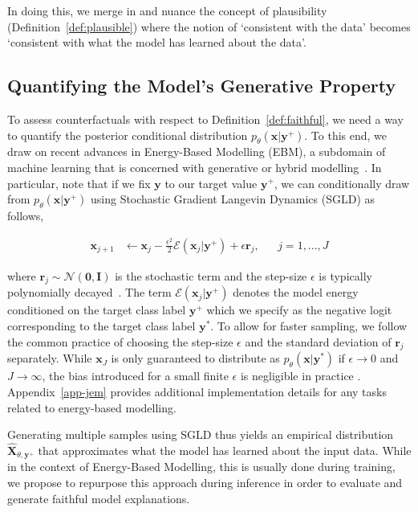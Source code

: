 \documentclass{article}
\begin{document}
In doing this, we merge in and nuance the concept of plausibility (Definition~\ref{def:plausible}) where the notion of `consistent with the data' becomes `consistent with what the model has learned about the data'.

\subsection{Quantifying the Model's Generative Property}

To assess counterfactuals with respect to Definition~\ref{def:faithful}, we need a way to quantify the posterior conditional distribution $p_{\theta}(\mathbf{x}|\mathbf{y}^+)$. To this end, we draw on recent advances in Energy-Based Modelling (EBM), a subdomain of machine learning that is concerned with generative or hybrid modelling~\citep{grathwohl2020your,du2020implicit}. In particular, note that if we fix $\mathbf{y}$ to our target value $\mathbf{y}^+$, we can conditionally draw from $p_{\theta}(\mathbf{x}|\mathbf{y}^+)$ using Stochastic Gradient Langevin Dynamics (SGLD) as follows, 

\begin{equation}\label{eq:sgld}
  \begin{aligned}
    \mathbf{x}_{j+1} &\leftarrow \mathbf{x}_j - \frac{\epsilon^2}{2} \mathcal{E}(\mathbf{x}_j|\mathbf{y}^+) + \epsilon \mathbf{r}_j, && j=1,...,J
  \end{aligned}
\end{equation}

where $\mathbf{r}_j \sim \mathcal{N}(\mathbf{0},\mathbf{I})$ is the stochastic term and the step-size $\epsilon$ is typically polynomially decayed~\citep{welling2011bayesian}. The term $\mathcal{E}(\mathbf{x}_j|\mathbf{y}^+)$ denotes the model energy conditioned on the target class label $\mathbf{y}^+$ which we specify as the negative logit corresponding to the target class label $\mathbf{y}^*$. To allow for faster sampling, we follow the common practice of choosing the step-size $\epsilon$ and the standard deviation of $\mathbf{r}_j$ separately. While $\mathbf{x}_J$ is only guaranteed to distribute as $p_{\theta}(\mathbf{x}|\mathbf{y}^*)$ if $\epsilon \rightarrow 0$ and $J \rightarrow \infty$, the bias introduced for a small finite $\epsilon$ is negligible in practice \citep{murphy2023probabilistic,grathwohl2020your}. Appendix~\ref{app-jem} provides additional implementation details for any tasks related to energy-based modelling. 

Generating multiple samples using SGLD thus yields an empirical distribution $\hat{\mathbf{X}}_{\theta,\mathbf{y}^+}$ that approximates what the model has learned about the input data. While in the context of Energy-Based Modelling, this is usually done during training, we propose to repurpose this approach during inference in order to evaluate and generate faithful model explanations.
\end{document}
